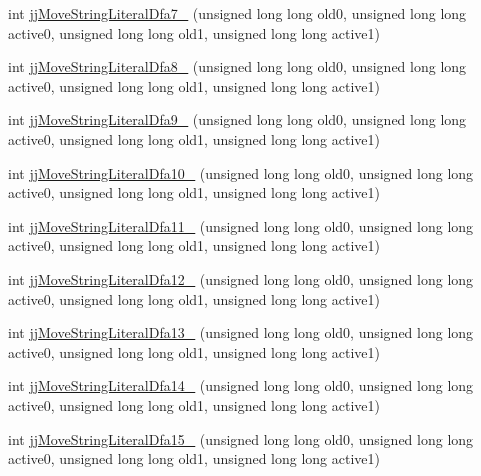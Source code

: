 \begin{DoxyCompactItemize}
\item 
int \hyperlink{classvhdl_1_1parser_1_1_vhdl_parser_token_manager_ad83fff52a25eca007bfe403ccb636a27}{jj\+Move\+String\+Literal\+Dfa7\+\_} (unsigned long long old0, unsigned long long active0, unsigned long long old1, unsigned long long active1)
\item 
int \hyperlink{classvhdl_1_1parser_1_1_vhdl_parser_token_manager_a5d95c7e8185ec845ecf6e93e98d196e2}{jj\+Move\+String\+Literal\+Dfa8\+\_} (unsigned long long old0, unsigned long long active0, unsigned long long old1, unsigned long long active1)
\item 
int \hyperlink{classvhdl_1_1parser_1_1_vhdl_parser_token_manager_af64afd5c00603df4ea645484cd9bbc58}{jj\+Move\+String\+Literal\+Dfa9\+\_} (unsigned long long old0, unsigned long long active0, unsigned long long old1, unsigned long long active1)
\item 
int \hyperlink{classvhdl_1_1parser_1_1_vhdl_parser_token_manager_acef807a99ab2dd2390d012ff64d22fb3}{jj\+Move\+String\+Literal\+Dfa10\+\_} (unsigned long long old0, unsigned long long active0, unsigned long long old1, unsigned long long active1)
\item 
int \hyperlink{classvhdl_1_1parser_1_1_vhdl_parser_token_manager_add1a4522bb6c785c3497a5c8e19b06af}{jj\+Move\+String\+Literal\+Dfa11\+\_} (unsigned long long old0, unsigned long long active0, unsigned long long old1, unsigned long long active1)
\item 
int \hyperlink{classvhdl_1_1parser_1_1_vhdl_parser_token_manager_ae41f0ed788872df22bc48d9ee2d031e4}{jj\+Move\+String\+Literal\+Dfa12\+\_} (unsigned long long old0, unsigned long long active0, unsigned long long old1, unsigned long long active1)
\item 
int \hyperlink{classvhdl_1_1parser_1_1_vhdl_parser_token_manager_a70d351bd7f86771787fa12836f8a88f2}{jj\+Move\+String\+Literal\+Dfa13\+\_} (unsigned long long old0, unsigned long long active0, unsigned long long old1, unsigned long long active1)
\item 
int \hyperlink{classvhdl_1_1parser_1_1_vhdl_parser_token_manager_a42c8071ad0ed12f60daf4a7f8dda64b4}{jj\+Move\+String\+Literal\+Dfa14\+\_} (unsigned long long old0, unsigned long long active0, unsigned long long old1, unsigned long long active1)
\item 
int \hyperlink{classvhdl_1_1parser_1_1_vhdl_parser_token_manager_aadb91db09c8657b41728b417048a974d}{jj\+Move\+String\+Literal\+Dfa15\+\_} (unsigned long long old0, unsigned long long active0, unsigned long long old1, unsigned long long active1)

\end{DoxyCompactItemize}
